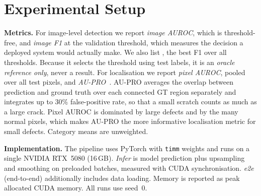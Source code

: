 \section{Experimental Setup}
\label{sec:setup}

\textbf{Metrics.}
For image-level detection we report \emph{image AUROC}, which is threshold-free, and \emph{image F1} at the validation threshold, which measures the decision a deployed system would actually make.
We also list \oracle{}, the best F1 over all thresholds.
Because it selects the threshold using test labels, it is an \emph{oracle reference only}, never a result.
For localisation we report \emph{pixel AUROC}, pooled over all test pixels, and \emph{AU-PRO}~\cite{bergmann2020students,bergmann2021mvtec}.
AU-PRO averages the overlap between prediction and ground truth over each connected GT region separately and integrates up to 30\% false-positive rate, so that a small scratch counts as much as a large crack.
Pixel AUROC is dominated by large defects and by the many normal pixels, which makes AU-PRO the more informative localisation metric for small defects.
Category means are unweighted.

\textbf{Implementation.}
The pipeline uses PyTorch with \texttt{timm} weights and runs on a single NVIDIA RTX~5080 (16\,GB).
\emph{Infer} is model prediction plus upsampling and smoothing on preloaded batches, measured with CUDA synchronisation.
\emph{e2e} (end-to-end) additionally includes data loading.
Memory is reported as peak allocated CUDA memory.
All runs use seed~0.
